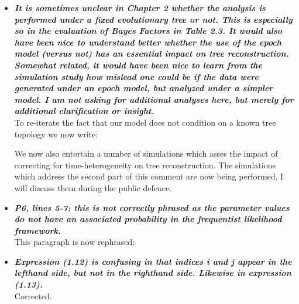 \documentclass[english]{article}
\begin{document}
\begin{itemize}
\item {
{\it
\textbf{
It is sometimes unclear in Chapter 2 whether the analysis is performed under a fixed evolutionary tree or not. 
This is especially so in the evaluation of Bayes Factors in Table 2.3. 
It would also have been nice to understand better whether the use of the epoch model (versus not) has an essential impact on tree reconstruction. 
Somewhat related, it would have been nice to learn from the simulation study how mislead one could be if the data were generated under an epoch model, but analyzed under a simpler model. 
I am not asking for additional analyses here, but merely for additional clarification or insight.
}%
}%
}%
\\
To re-iterate the fact that our model does not condition on a known tree topology we now write:

\begin{quote}
\myeditsvtwo
\end{quote}

We now also entertain a number of simulations which asses the impact of correcting for time-heterogeneity on tree reconstruction. 
The simulations which address the second part of this comment are now being performed, I will discuss them during the public defence.


\item {
{\it
\textbf{
P6, lines 5-7: this is not correctly phrased as the parameter values do not have an associated probability in the frequentist likelihood framework.
}%
}%
}%
\\
This paragraph is now rephrased:

\begin{quote}
\myeditsvthree
\end{quote}


\item {
{\it
\textbf{
Expression (1.12) is confusing in that indices i and j appear in the lefthand side, but not in the righthand side. 
Likewise in expression (1.13).
}%
}%
}%
\\
Corrected.




\end{itemize}
\end{document}
